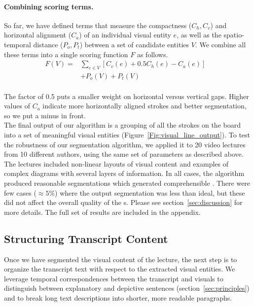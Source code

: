\paragraph{Combining scoring terms.} So far, we have defined terms that measure the compactness ($C_h, C_v$) and horizontal alignment ($C_a$) of an individual visual entity $e$, as well as the spatio-temporal distance ($P_o, P_t$) between a set of candidate entities $V$. 
%
We combine all these terms into a single scoring function $F$ as follows.  
\begin{align}
F(V) = &\sum_{e \in V}[C_v(e) + 0.5C_h(e)- C_a(e)]&\\
&+ P_o(V) + P_t(V)
\end{align}\\
The factor of 0.5 puts a smaller weight on horizontal versus vertical
gaps. Higher values of $C_a$ indicate more horizontally aligned strokes and better segmentation, so we put a minus in front.\\

The final output of our algorithm is a grouping of all the strokes on the
board into a set of meaningful visual entities (Figure~\ref{Fig:visual_line_output}).
To test the robustness of our segmentation algorithm, we applied it to 20 video lectures from 10 different authors, using the same set of parameters as described above. The lectures included non-linear layouts of visual content and examples of complex diagrams with several layers of information. In all cases, the algorithm produced reasonable segmentations which generated comprehensible \systemname. There were few cases ($\approx 5\%$) where the output segmentation was less than ideal, but these did not affect the overall quality of the \systemname s. Please see section~\ref{sec:discussion} for more details. The full set of results are included in the appendix. 
\subsection{Structuring Transcript Content}
\label{sec:text_corr}

Once we have segmented the visual content of the lecture, the next step is to organize the transcript text with respect to the extracted visual entities.
We leverage temporal correspondences between the transcript and visuals to distinguish between explanatory and depictive sentences (section~\ref{sec:principles}) and to break long text descriptions into shorter, more readable paragraphs.

